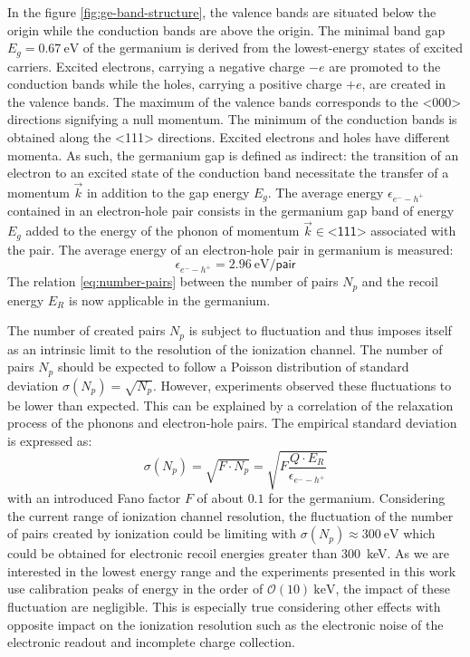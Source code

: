 In the figure \ref{fig:ge-band-structure}, the valence bands are situated below the origin while the conduction bands are above the origin. The minimal band gap $E_g = \SI{0.67}{\eV}$ of the germanium is derived from the lowest-energy states of excited carriers. Excited electrons, carrying a negative charge $-e$ are promoted to the conduction bands while the holes, carrying a positive charge $+e$, are created in the valence bands. The maximum of the valence bands corresponds to the <000> directions signifying a null momentum. The minimum of the conduction bands is obtained along the <111> directions. Excited electrons and holes have different momenta. As such, the germanium gap is defined as indirect: the transition of an electron to an excited state of the conduction band necessitate the transfer of a momentum $\vec{k}$ in addition to the gap energy $E_g$. The average energy $\epsilon_{e^--h^+}$ contained in an electron-hole pair consists in the germanium gap band of energy $E_g$ added to the energy of the phonon of momentum $\vec{k} \in \textsf{<111>}$ associated with the pair. The average energy of an electron-hole pair in germanium is measured:
\begin{equation}
\label{eq:energy-pair}
\epsilon_{e^--h^+} = \SI{2.96}{\eV \per \textsf{pair}}
\end{equation} 
The relation \ref{eq:number-pairs} between the number of pairs $N_p$ and the recoil energy $E_R$ is now applicable in the germanium.

The number of created pairs $N_p$ is subject to fluctuation and thus imposes itself as an intrinsic limit to the resolution of the ionization channel. The number of pairs $N_p$ should be expected to follow a Poisson distribution of standard deviation $\sigma(N_p) = \sqrt{N_p}$. However, experiments observed these fluctuations to be lower than expected. This can be explained by a correlation of the relaxation process of the phonons and electron-hole pairs. The empirical standard deviation is expressed as:
\begin{equation}
\sigma(N_p)
=
\sqrt{F \cdot N_p}
=
\sqrt{F \frac{Q \cdot E_R}{\epsilon_{e^--h^+}}}
\end{equation}
with an introduced Fano factor $F$ of about $0.1$ for the germanium. Considering the current range of ionization channel resolution, the fluctuation of the number of pairs created by ionization could be limiting with $\sigma(N_p) \approx \SI{300}{\eV}$ which could be obtained for electronic recoil energies greater than \SI{300}{\kilo\eV}. As we are interested in the lowest energy range and the experiments presented in this work use calibration peaks of energy in the order of $\mathcal{O}(10)\ \si{\kilo\eV}$, the impact of these fluctuation are negligible. This is especially true considering other effects with opposite impact on the ionization resolution such as the electronic noise of the electronic readout and incomplete charge collection.

